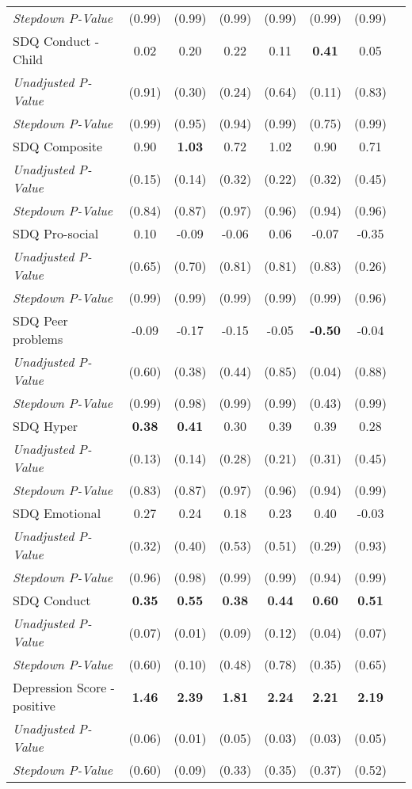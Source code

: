 \begin{tabular}{l c c c c c c c}
\quad \textit{Stepdown P-Value} & (0.99) & (0.99) & (0.99) & (0.99) & (0.99) & (0.99) \\
SDQ Conduct - Child & 0.02 & 0.20 & 0.22 & 0.11 & \textbf{ 0.41 } & 0.05 \\
\quad \textit{Unadjusted P-Value} & (0.91) & (0.30) & (0.24) & (0.64) & (0.11) & (0.83) \\
\quad \textit{Stepdown P-Value} & (0.99) & (0.95) & (0.94) & (0.99) & (0.75) & (0.99) \\
SDQ Composite & 0.90 & \textbf{ 1.03 } & 0.72 & 1.02 & 0.90 & 0.71 \\
\quad \textit{Unadjusted P-Value} & (0.15) & (0.14) & (0.32) & (0.22) & (0.32) & (0.45) \\
\quad \textit{Stepdown P-Value} & (0.84) & (0.87) & (0.97) & (0.96) & (0.94) & (0.96) \\
SDQ Pro-social & 0.10 & -0.09 & -0.06 & 0.06 & -0.07 & -0.35 \\
\quad \textit{Unadjusted P-Value} & (0.65) & (0.70) & (0.81) & (0.81) & (0.83) & (0.26) \\
\quad \textit{Stepdown P-Value} & (0.99) & (0.99) & (0.99) & (0.99) & (0.99) & (0.96) \\
SDQ Peer problems & -0.09 & -0.17 & -0.15 & -0.05 & \textbf{ -0.50 } & -0.04 \\
\quad \textit{Unadjusted P-Value} & (0.60) & (0.38) & (0.44) & (0.85) & (0.04) & (0.88) \\
\quad \textit{Stepdown P-Value} & (0.99) & (0.98) & (0.99) & (0.99) & (0.43) & (0.99) \\
SDQ Hyper & \textbf{ 0.38 } & \textbf{ 0.41 } & 0.30 & 0.39 & 0.39 & 0.28 \\
\quad \textit{Unadjusted P-Value} & (0.13) & (0.14) & (0.28) & (0.21) & (0.31) & (0.45) \\
\quad \textit{Stepdown P-Value} & (0.83) & (0.87) & (0.97) & (0.96) & (0.94) & (0.99) \\
SDQ Emotional & 0.27 & 0.24 & 0.18 & 0.23 & 0.40 & -0.03 \\
\quad \textit{Unadjusted P-Value} & (0.32) & (0.40) & (0.53) & (0.51) & (0.29) & (0.93) \\
\quad \textit{Stepdown P-Value} & (0.96) & (0.98) & (0.99) & (0.99) & (0.94) & (0.99) \\
SDQ Conduct & \textbf{ 0.35 } & \textbf{ 0.55 } & \textbf{ 0.38 } & \textbf{ 0.44 } & \textbf{ 0.60 } & \textbf{ 0.51 } \\
\quad \textit{Unadjusted P-Value} & (0.07) & (0.01) & (0.09) & (0.12) & (0.04) & (0.07) \\
\quad \textit{Stepdown P-Value} & (0.60) & (0.10) & (0.48) & (0.78) & (0.35) & (0.65) \\
Depression Score - positive & \textbf{ 1.46 } & \textbf{ 2.39 } & \textbf{ 1.81 } & \textbf{ 2.24 } & \textbf{ 2.21 } & \textbf{ 2.19 } \\
\quad \textit{Unadjusted P-Value} & (0.06) & (0.01) & (0.05) & (0.03) & (0.03) & (0.05) \\
\quad \textit{Stepdown P-Value} & (0.60) & (0.09) & (0.33) & (0.35) & (0.37) & (0.52) \\
\bottomrule
\end{tabular}
